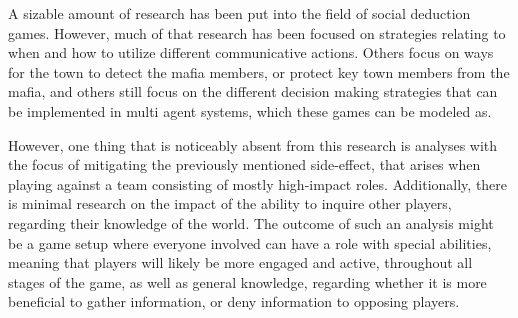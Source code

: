 A sizable amount of research has been put into the field of social deduction
games. However, much of that research has been focused on strategies relating
to when and how to utilize different communicative actions\cite{commitment}.
Others focus on ways for the town to detect the mafia
members\cite{werewolf_stealth}, or protect key town members from the
mafia\cite{werewolf_nash_equilibrium}, and others still focus on the different
decision making strategies that can be implemented in multi agent systems,
which these games can be modeled
as\cite{modelling_multi_agent_epistemic_systems}\cite{multi_agent_epistemic_planner_common_knowledge}\cite{probibalistic_multiagent_systems}.

However, one thing that is noticeably absent from this research is analyses
with the focus of mitigating the previously mentioned side-effect, that arises when playing against a team consisting of mostly high-impact roles. Additionally, there is minimal research on the impact of the ability to inquire other players, regarding their knowledge of the world. The outcome of such an analysis might be a game setup where everyone involved can have a role with special abilities, meaning that players will likely be more engaged and active, throughout all stages of the game, as well as general knowledge, regarding whether it is more beneficial to gather information, or deny information to opposing players. 